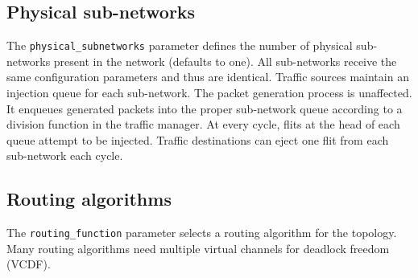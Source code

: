\documentclass[11pt]{article}
\begin{document}
\subsection{Physical sub-networks}
\label{sec:physical_subnets}

The \texttt{physical\_subnetworks} parameter defines the number of physical sub-networks present in the network (defaults to one).
All sub-networks receive the same configuration parameters and thus are identical. Traffic sources
maintain an injection queue for each sub-network. The packet generation process is unaffected. It enqueues generated packets into the
proper sub-network queue according to a division function in the traffic manager. At every cycle, flits at the head of each queue attempt to be injected.
Traffic destinations can eject one flit from each sub-network each cycle.


\subsection{Routing algorithms}
\label{sec:routing_algs}

The \texttt{routing\_function} parameter selects a routing algorithm
for the topology.  Many routing algorithms need multiple virtual
channels for deadlock freedom (VCDF).
\end{document}
